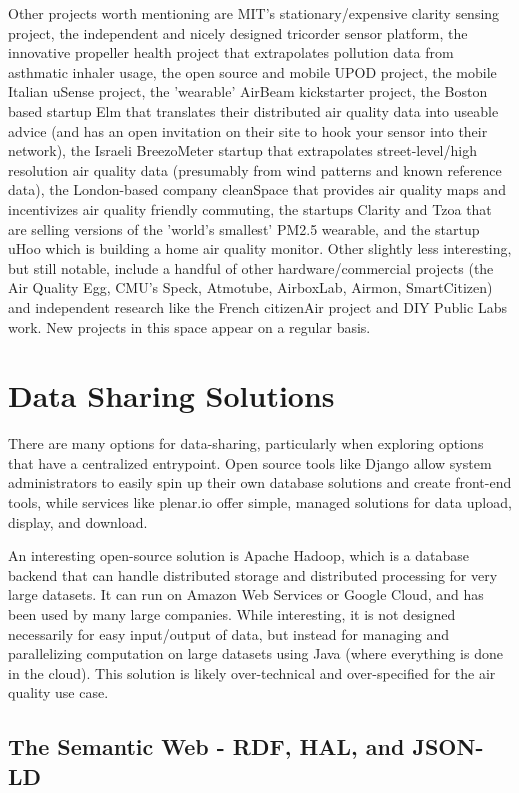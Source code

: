 Other projects worth mentioning are MIT's stationary/expensive clarity sensing project, the independent and nicely designed tricorder sensor platform, the innovative propeller health project that extrapolates pollution data from asthmatic inhaler usage, the open source and mobile UPOD project, the mobile Italian uSense project, the 'wearable' AirBeam kickstarter project, the Boston based startup Elm that translates their distributed air quality data into useable advice (and has an open invitation on their site to hook your sensor into their network), the Israeli BreezoMeter startup that extrapolates street-level/high resolution air quality data (presumably from wind patterns and known reference data),  the London-based company cleanSpace that provides air quality maps and incentivizes air quality friendly commuting, the startups Clarity and Tzoa that are selling versions of the 'world's smallest' PM2.5 wearable, and the startup uHoo which is building a home air quality monitor.   Other slightly less interesting, but still notable, include a handful of other hardware/commercial projects (the Air Quality Egg, CMU's Speck, Atmotube, AirboxLab, Airmon, SmartCitizen) and independent research like the French citizenAir project and DIY Public Labs work.  New projects in this space appear on a regular basis. 

\section{Data Sharing Solutions}

There are many options for data-sharing, particularly when exploring options that have a centralized entrypoint.  Open source tools like Django allow system administrators to easily spin up their own database solutions and create front-end tools, while services like plenar.io offer simple, managed solutions for data upload, display, and download.  

An interesting open-source solution is Apache Hadoop, which is a database backend that can handle distributed storage and distributed processing for very large datasets.  It can run on Amazon Web Services or Google Cloud, and has been used by many large companies.  While interesting, it is not designed necessarily for easy input/output of data, but instead for managing and parallelizing computation on large datasets using Java (where everything is done in the cloud).  This solution is likely over-technical and over-specified for the air quality use case.  


\subsection{The Semantic Web - RDF, HAL, and JSON-LD}

